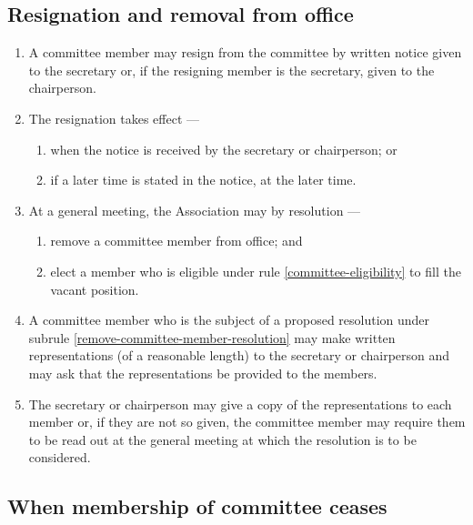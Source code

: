 \documentclass[../constitution.tex]{subfiles}
\begin{document}
\hypertarget{resignation-and-removal-from-office}{%
  \subsection{Resignation and removal from office}\label{resignation-and-removal-from-office}}

\begin{enumerate}

  \item A committee member may resign from the committee by written notice given to the secretary or, if the resigning member is the secretary, given to the chairperson.
  \item The resignation takes effect ---

        \begin{enumerate}

          \item when the notice is received by the secretary or chairperson; or
          \item if a later time is stated in the notice, at the later time.
        \end{enumerate}
  \item At a general meeting, the Association may by resolution ---

        \begin{enumerate}

          \item remove a committee member from office; and \label{remove-committee-member-resolution}
          \item elect a member who is eligible under rule \ref{committee-eligibility} to fill the vacant position. \label{elect-committee-at-general-meeting}
        \end{enumerate}
  \item A committee member who is the subject of a proposed resolution under subrule \ref{remove-committee-member-resolution} may make written representations (of a reasonable length) to the secretary or chairperson and may ask that the representations be provided to the members.
  \item The secretary or chairperson may give a copy of the representations to each member or, if they are not so given, the committee member may require them to be read out at the general meeting at which the resolution is to be considered.
\end{enumerate}

\hypertarget{when-membership-of-committee-ceases}{%
  \subsection{When membership of committee ceases}\label{when-membership-of-committee-ceases}}
\end{document}
